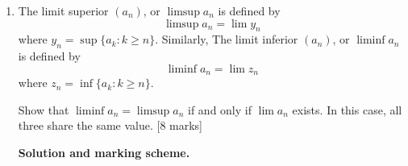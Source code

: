 \documentclass{article}
\begin{document}
\begin{enumerate}[label=(\alph*)]
\begin{mdframed}[linecolor=black, linewidth=1pt]
    Marks: 2 for the difference formula, 2 for a correct argument that $x_n^3\ge5$ for all $n$.
    
    \medskip
    \textbf{Step 3: Boundedness and existence of the limit (2 marks).}
    
    From Step 1, $x_n>0$ and from Step 2 we have $x_n\ge\sqrt[3]{5}$ for all $n$, and $(x_n)$ is decreasing. So $(x_n)$ is bounded below and monotone decreasing, hence convergent by the Monotone Convergence Theorem. Let
    \[
    \lim_{n\to\infty} x_n = L.
    \]
    \hfill (2)
    
    \medskip
    \textbf{Step 4: Identify the limit (2 marks).}
    
    Take limits in the recursion and use the algebra of limits:
    \[
    L = \frac13\left(2L + \frac{5}{L^2}\right).
    \]
    Multiply by 3:
    \[
    3L = 2L + \frac{5}{L^2}
    \quad\Rightarrow\quad
    L = \frac{5}{L^2}
    \quad\Rightarrow\quad
    L^3 = 5.
    \]
    Since $x_n>0$ for all $n$, the limit must be the positive root, so
    \[
    \lim_{n\to\infty} x_n = \sqrt[3]{5}.
    \]
    
    \textbf{Marking scheme (10):}
    \begin{itemize}
      \item 2 marks: proof that $x_n>0$ for all $n$ (induction).
      \item 2 marks: correct computation $x_n-x_{n+1} = \frac13\frac{x_n^3-5}{x_n^2}$.
      \item 2 marks: justification that $x_n^3\ge5$ (or $x_n\ge\sqrt[3]{5}$) for all $n$.
      \item 2 marks: monotone decreasing and bounded below $\Rightarrow$ convergence.
      \item 2 marks: limit equation, solve $L^3=5$ and choose positive root.
    \end{itemize}
    \end{mdframed}

    \item The limit superior $(a_n)$, or $\limsup a_n$ is defined by
    \[
    \limsup a_n = \lim y_n
    \]
    where $y_n = \sup \{ a_k : k \ge n \}$. Similarly, The limit inferior $(a_n)$, or $\liminf a_n$ is defined by
    \[
    \liminf a_n = \lim z_n
    \]
    where $z_n = \inf \{ a_k : k \ge n \}$.
    
    Show that $\liminf a_n = \limsup a_n$ if and only if $\lim a_n$ exists. In this case, all three share the same value. [8 marks]

    \begin{mdframed}[linecolor=black, linewidth=1pt]
    \textbf{Solution and marking scheme.}
    

\end{mdframed}
\end{enumerate}
\end{document}
